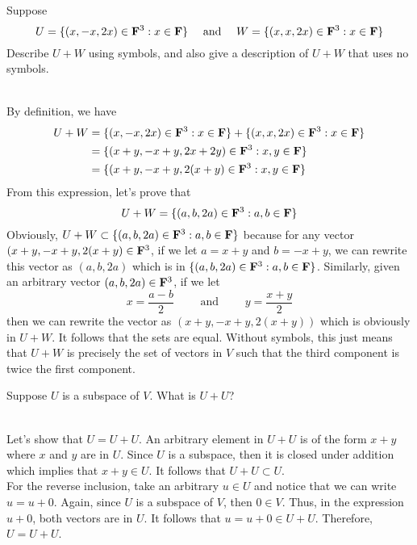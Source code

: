 \begin{exercise}
    Suppose
    $$U = \{(x, -x, 2x) \in \mathbf{F}^3:x \in \mathbf{F}\} \quad \text{ and } \quad W = \{(x, x, 2x) \in \mathbf{F}^3:x \in \mathbf{F}\} $$
    Describe $U+W$ using symbols, and also give a description of $U + W$ that uses no symbols. \\
\end{exercise}

\begin{solution}
    \\ By definition, we have
    \begin{align*}
        U+W &= \{(x, -x, 2x) \in \mathbf{F}^3:x \in \mathbf{F}\} + \{(x, x, 2x) \in \mathbf{F}^3:x \in \mathbf{F}\} \\
        &= \{(x+y, -x+y, 2x+2y) \in \mathbf{F}^3:x,y \in \mathbf{F}\} \\
        &= \{(x+y, -x+y, 2(x+y) \in \mathbf{F}^3:x,y \in \mathbf{F}\}
    \end{align*}
    From this expression, let's prove that
    $$U+W = \{(a, b, 2a) \in \mathbf{F}^3:a,b \in \mathbf{F}\}$$
    Obviously, $U+W \subset \{(a, b, 2a) \in \mathbf{F}^3:a,b \in \mathbf{F}\}$ because for any vector $(x+y, -x+y, 2(x+y) \in \mathbf{F}^3$, if we let $a = x+y$ and $b = -x+y$, we can rewrite this vector as $(a,b,2a)$ which is in $ \{(a, b, 2a) \in \mathbf{F}^3:a,b \in \mathbf{F}\}$. Similarly, given an arbitrary vector $(a, b, 2a) \in \mathbf{F}^3$, if we let
    $$x = \frac{a-b}{2} \qquad \text{ and } \qquad y = \frac{x+y}{2}$$
    then we can rewrite the vector as $(x+y, -x+y, 2(x+y))$ which is obviously in $U+W$. It follows that the sets are equal. Without symbols, this just means that $U+W$ is precisely the set of vectors in $V$ such that the third component is twice the first component. \\
\end{solution}

\begin{exercise}
    Suppose $U$ is a subspace of $V$. What is $U+U$? \\
\end{exercise}

\begin{solution}
    \\ Let's show that $U = U+U$. An arbitrary element in $U+U$ is of the form $x+y$ where $x$ and $y$ are in $U$. Since $U$ is a subspace, then it is closed under addition which implies that $x+y \in U$. It follows that $U+U \subset U$. \\
    For the reverse inclusion, take an arbitrary $u \in U$ and notice that we can write $u = u + 0$. Again, since $U$ is a subspace of $V$, then $0 \in V$. Thus, in the expression $u+0$, both vectors are in $U$. It follows that $u  = u+0 \in U+U$. Therefore, $U = U+U$.\\
\end{solution}

